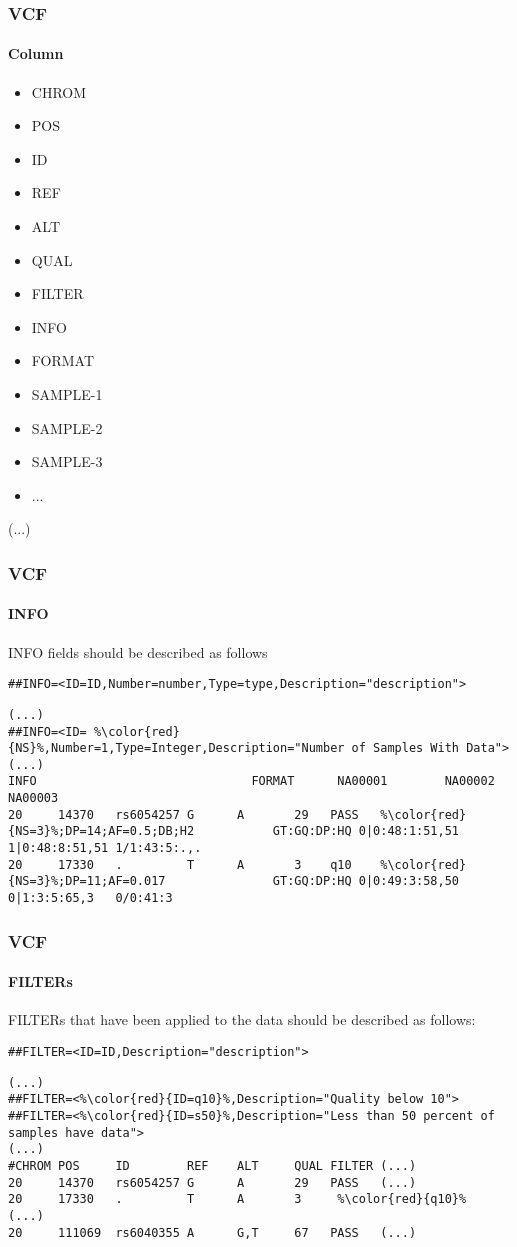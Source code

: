\documentclass{beamer}
\begin{document}
\begin{frame}[fragile]
\frametitle{VCF}
\framesubtitle{Column}
\begin{itemize}
\item CHROM
\item POS
\item ID
\item REF
\item ALT
\item QUAL
\item FILTER
\item INFO
\item FORMAT
\item SAMPLE-1
\item SAMPLE-2
\item SAMPLE-3
\item ...
\end{itemize}
(...)
\end{frame}

\begin{frame}[fragile]
\frametitle{VCF}
\framesubtitle{INFO}

INFO fields should be described as follows
\begin{lstlisting}[breaklines=true]
##INFO=<ID=ID,Number=number,Type=type,Description="description">
\end{lstlisting}

\begin{lstlisting}[basicstyle=\tiny,breaklines=false,escapechar=\%]
(...)
##INFO=<ID= %\color{red}{NS}%,Number=1,Type=Integer,Description="Number of Samples With Data">
(...)
INFO                              FORMAT      NA00001        NA00002        NA00003
20     14370   rs6054257 G      A       29   PASS   %\color{red}{NS=3}%;DP=14;AF=0.5;DB;H2           GT:GQ:DP:HQ 0|0:48:1:51,51 1|0:48:8:51,51 1/1:43:5:.,.
20     17330   .         T      A       3    q10    %\color{red}{NS=3}%;DP=11;AF=0.017               GT:GQ:DP:HQ 0|0:49:3:58,50 0|1:3:5:65,3   0/0:41:3
\end{lstlisting}
\end{frame}

\begin{frame}[fragile]
\frametitle{VCF}
\framesubtitle{FILTERs}
FILTERs that have been applied to the data should be described as follows:
\begin{lstlisting}[breaklines=true]
##FILTER=<ID=ID,Description="description">
\end{lstlisting}

\begin{lstlisting}[basicstyle=\tiny,breaklines=false,escapechar=\%]
(...)
##FILTER=<%\color{red}{ID=q10}%,Description="Quality below 10">
##FILTER=<%\color{red}{ID=s50}%,Description="Less than 50 percent of samples have data">
(...)
#CHROM POS     ID        REF    ALT     QUAL FILTER (...)
20     14370   rs6054257 G      A       29   PASS   (...)
20     17330   .         T      A       3     %\color{red}{q10}%    (...)
20     111069  rs6040355 A      G,T     67   PASS   (...)
\end{lstlisting}
\end{frame}
\end{document}
